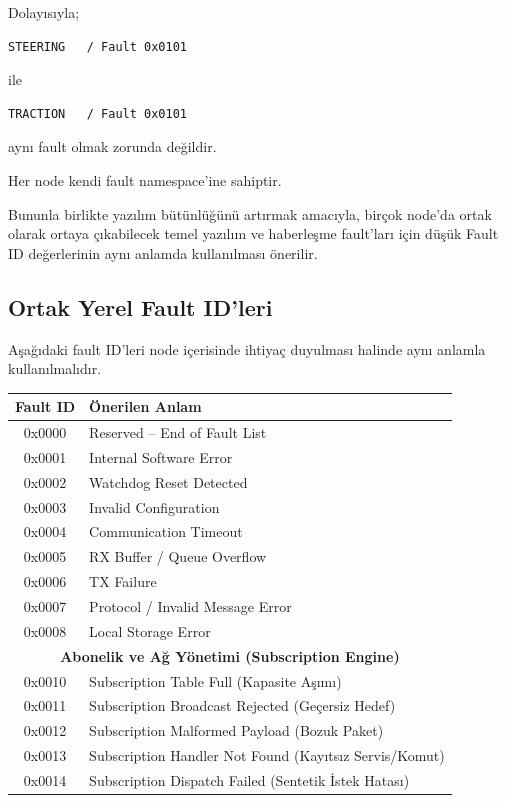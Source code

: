 \documentclass[a4paper,11pt]{article}
\begin{document}
Dolayısıyla;

\begin{lstlisting}
STEERING   / Fault 0x0101
\end{lstlisting}

ile

\begin{lstlisting}
TRACTION   / Fault 0x0101
\end{lstlisting}

aynı fault olmak zorunda değildir.

Her node kendi fault namespace'ine sahiptir.

Bununla birlikte yazılım bütünlüğünü artırmak amacıyla,
birçok node'da ortak olarak ortaya çıkabilecek temel yazılım ve
haberleşme fault'ları için düşük Fault ID değerlerinin aynı anlamda
kullanılması önerilir.

\subsection{Ortak Yerel Fault ID'leri}

Aşağıdaki fault ID'leri node içerisinde ihtiyaç duyulması halinde
aynı anlamla kullanılmalıdır.

\begin{center}
\begin{tabular}{c l}
\toprule
\textbf{Fault ID} & \textbf{Önerilen Anlam} \\
\midrule
0x0000 & Reserved -- End of Fault List \\
0x0001 & Internal Software Error \\
0x0002 & Watchdog Reset Detected \\
0x0003 & Invalid Configuration \\
0x0004 & Communication Timeout \\
0x0005 & RX Buffer / Queue Overflow \\
0x0006 & TX Failure \\
0x0007 & Protocol / Invalid Message Error \\
0x0008 & Local Storage Error \\
\midrule
\multicolumn{2}{c}{\textbf{Abonelik ve Ağ Yönetimi (Subscription Engine)}} \\
\midrule
0x0010 & Subscription Table Full (Kapasite Aşımı) \\
0x0011 & Subscription Broadcast Rejected (Geçersiz Hedef) \\
0x0012 & Subscription Malformed Payload (Bozuk Paket) \\
0x0013 & Subscription Handler Not Found (Kayıtsız Servis/Komut) \\
0x0014 & Subscription Dispatch Failed (Sentetik İstek Hatası) \\
\bottomrule
\end{tabular}
\end{center}
\end{document}

